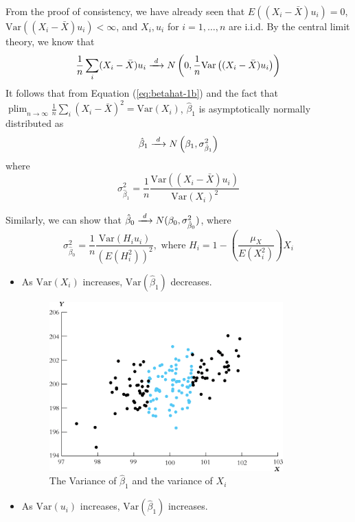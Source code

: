 \documentclass[a4paper,11pt]{article}
\newcommand{\var}{\mathrm{Var}}
\newcommand{\rarrowd}[1]{\xrightarrow{\text{ \textit #1 }}}
\DeclareMathOperator*{\plim}{plim}
\newcommand{\plimn}{\plim_{n \rightarrow \infty}}
\begin{document}
From the proof of consistency, we have already seen that \(E((X_i -
\bar{X})u_i) = 0\), \(\var((X_i - \bar{X})u_i) <\infty\),
and \(X_i, u_i\) for \(i=1, \ldots, n\) are i.i.d. By the central limit
theory, we know that
\[\frac{1}{n}\sum_i (X_i - \bar{X})u_i \rarrowd{d} N \left(0, \frac{1}{n}\var\left((X_i - \bar{X})u_i\right) \right) \]
It follows that from Equation (\ref{eq:betahat-1b}) and the fact that
\(\plimn \frac{1}{n}\sum_i (X_i - \bar{X})^2 = \var(X_i)\),
\(\hat{\beta}_1\) is asymptotically normally distributed as
\[ \hat{\beta}_1 \rarrowd{d} N\left( \beta_1, \sigma^2_{\hat{\beta}_1}\right) \]
where
\begin{equation}
\label{eq:sigmabeta-1}
\sigma^2_{\hat{\beta}_1} = \frac{1}{n}\frac{\var\left((X_i - \bar{X})u_i\right)}{\var(X_i)^2}
\end{equation}

Similarly, we can show that \(\hat{\beta}_0 \rarrowd{d} N(\beta_0,
\sigma^2_{\hat{\beta}_0})\), where
\begin{equation}
\label{eq:sigmabeta-2}
\sigma^2_{\hat{\beta}_0} = \frac{1}{n}\frac{\var(H_i u_i)}{\left( E(H^2_i) \right)^2}, \text{ where }
H_i = 1 - \left( \frac{\mu_X}{E(X_i^2)} \right)X_i
\end{equation}

\begin{itemize}
\item As \(\var(X_i)\) increases, \(\var(\hat{\beta}_1)\) decreases.

\begin{figure}[htbp]
\centering
\includegraphics[width=0.85\textwidth]{img/fig-4-6.png}
\caption{\label{fig:orgc2683e1}
The Variance of \(\hat{\beta}_1\) and the variance of \(X_i\)}
\end{figure}

\item As \(\var(u_i)\) increases, \(\var(\hat{\beta}_1)\) increases.
\end{itemize}
\end{document}
